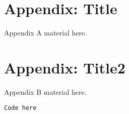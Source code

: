 

\section{Appendix: Title}
\label{appA}

Appendix A material here.



\section{Appendix: Title2}
\label{appB}

Appendix B material here. 

\begin{verbatim}
Code here
\end{verbatim}
